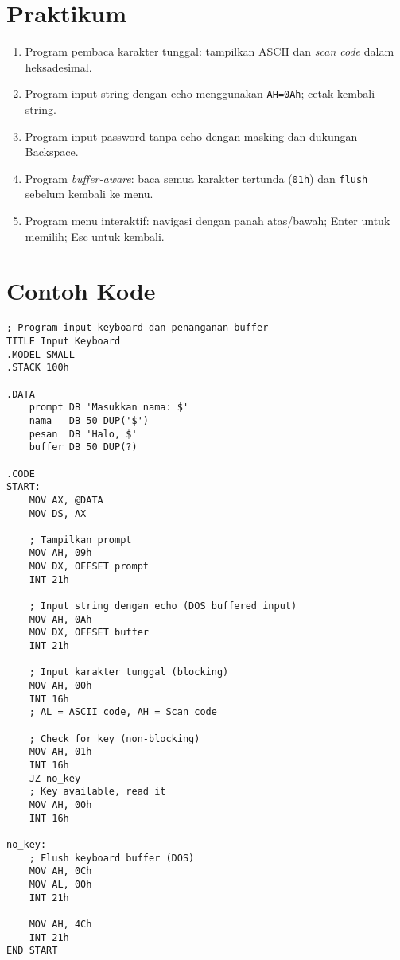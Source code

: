 \documentclass[../main.tex]{subfiles}
\begin{document}
\section{Praktikum}
\begin{enumerate}
  \item Program pembaca karakter tunggal: tampilkan ASCII dan \textit{scan code} dalam heksadesimal.
  \item Program input string dengan echo menggunakan \texttt{AH=0Ah}; cetak kembali string.
  \item Program input password tanpa echo dengan masking dan dukungan Backspace.
  \item Program \textit{buffer-aware}: baca semua karakter tertunda (\texttt{01h}) dan \texttt{flush} sebelum kembali ke menu.
  \item Program menu interaktif: navigasi dengan panah atas/bawah; Enter untuk memilih; Esc untuk kembali.
\end{enumerate}

\section{Contoh Kode}
\begin{verbatim}
; Program input keyboard dan penanganan buffer
TITLE Input Keyboard
.MODEL SMALL
.STACK 100h

.DATA
    prompt DB 'Masukkan nama: $'
    nama   DB 50 DUP('$')
    pesan  DB 'Halo, $'
    buffer DB 50 DUP(?)

.CODE
START:
    MOV AX, @DATA
    MOV DS, AX
    
    ; Tampilkan prompt
    MOV AH, 09h
    MOV DX, OFFSET prompt
    INT 21h
    
    ; Input string dengan echo (DOS buffered input)
    MOV AH, 0Ah
    MOV DX, OFFSET buffer
    INT 21h
    
    ; Input karakter tunggal (blocking)
    MOV AH, 00h
    INT 16h
    ; AL = ASCII code, AH = Scan code
    
    ; Check for key (non-blocking)
    MOV AH, 01h
    INT 16h
    JZ no_key
    ; Key available, read it
    MOV AH, 00h
    INT 16h
    
no_key:
    ; Flush keyboard buffer (DOS)
    MOV AH, 0Ch
    MOV AL, 00h
    INT 21h
    
    MOV AH, 4Ch
    INT 21h
END START
\end{verbatim}
\end{document}
